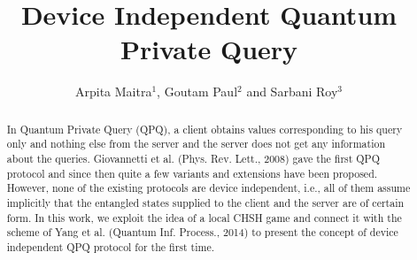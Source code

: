 \documentclass[twocolumn,pra,aps,amssymb]{revtex4}
\begin{document}
\newcommand{\ket}[1]{\ensuremath{\left|#1\right\rangle}}
\newcommand{\bra}[1]{\ensuremath{\left\langle#1\right|}}
\newcommand\floor[1]{\lfloor#1\rfloor}
\newcommand\ceil[1]{\lceil#1\rceil}
\newtheorem{definition}{Definition} 
\newtheorem{theorem}{Theorem} 
\newtheorem{claim}{Claim}
\newtheorem{lemma}{Lemma}
\title{Device Independent Quantum Private Query}
\author{Arpita Maitra$^1$, Goutam Paul$^2$ and Sarbani Roy$^3$}

\begin{abstract}
In Quantum Private Query (QPQ), a client obtains values corresponding to his query only and nothing else from the server and the server does not get any information about the queries. Giovannetti et al. (Phys. Rev. Lett., 2008) gave
the first QPQ protocol and since then quite a few variants and extensions have been proposed. However, none of the existing protocols are device independent, i.e., all of them assume implicitly that the entangled states supplied to the client and the server are of certain form. In this work, we exploit the idea of a local CHSH game and connect it with the scheme of Yang et al. (Quantum Inf. Process., 2014)  to present  the concept of device independent QPQ protocol for the first time.
\end{abstract}
\maketitle
\end{document}
